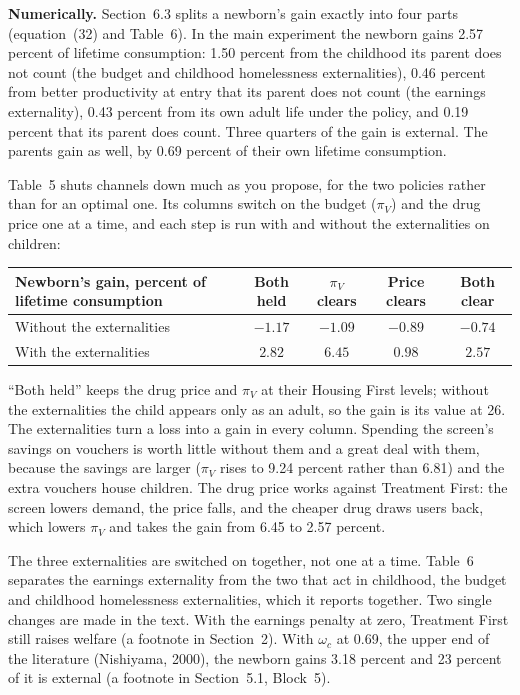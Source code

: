 \documentclass[11pt]{article}
\begin{document}
\begin{response}
\newresult \textbf{Numerically.} Section~6.3 splits a newborn's gain exactly into four
parts (equation~(32) and Table~6). In the main experiment the newborn gains 2.57 percent
of lifetime consumption: 1.50 percent from the childhood its parent does not count
(the budget and childhood homelessness externalities), 0.46 percent from better
productivity at entry that its parent does not count (the earnings externality), 0.43
percent from its own adult life under the policy, and 0.19 percent that its parent
does count. Three quarters of the gain is external. The parents gain as well, by 0.69
percent of their own lifetime consumption.

Table~5 shuts channels down much as you propose, for the two policies rather than for
an optimal one. Its columns switch on the budget ($\pi_V$) and the drug price one at
a time, and each step is run with and without the externalities on children:

\begin{center}\small
\begin{tabular}{@{}lcccc@{}}
\toprule
Newborn's gain, percent of lifetime consumption & Both held & $\pi_V$ clears & Price clears & Both clear \\
\midrule
Without the externalities & $-1.17$ & $-1.09$ & $-0.89$ & $-0.74$ \\
With the externalities & $2.82$ & $6.45$ & $0.98$ & $2.57$ \\
\bottomrule
\end{tabular}
\end{center}

``Both held'' keeps the drug price and $\pi_V$ at their Housing First levels; without
the externalities the child appears only as an adult, so the gain is its value at 26.
The externalities turn a loss into a gain in every column. Spending the screen's
savings on vouchers is worth little without them and a great deal with them, because
the savings are larger ($\pi_V$ rises to 9.24 percent rather than 6.81) and the extra
vouchers house children. The drug price works against Treatment First: the screen
lowers demand, the price falls, and the cheaper drug draws users back, which lowers
$\pi_V$ and takes the gain from 6.45 to 2.57 percent.

The three externalities are switched on together, not one at a time. Table~6
separates the earnings externality from the two that act in childhood, the budget and
childhood homelessness externalities, which it reports together. Two single changes
are made in the text. With the earnings penalty at zero, Treatment First still raises
welfare (a footnote in Section~2). With $\omega_c$ at 0.69, the upper end of the
literature (Nishiyama, 2000), the newborn gains 3.18 percent and 23 percent of it is
external (a footnote in Section~5.1, Block~5).


\end{response}
\end{document}
